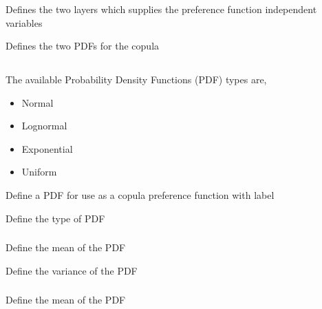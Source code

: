 \subsubsection[Independence copula]{}

 {Defines the two layers which supplies the preference function independent variables}

 {Defines the two PDFs for the copula}

\subsection{}

The available Probability Density Functions (PDF) types are,

\begin{itemize}
	\item Normal
	\item Lognormal
	\item Exponential
	\item Uniform
\end{itemize}

 {Define a PDF for use as a copula preference function with label}

 {Define the type of PDF}

\subsubsection[Normal]{}

 {Define the mean of the PDF}

 {Define the variance of the PDF}

\subsubsection[Lognormal]{}

 {Define the mean of the PDF}

